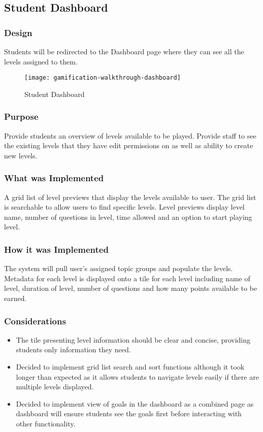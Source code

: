 \newpage

\subsection{Student Dashboard}
\subsubsection{Design}
Students will be redirected to the Dashboard page where they can see all the levels assigned to them.

\begin{figure}[h!]
    \texttt{[image: gamification-walkthrough-dashboard]}
    \centering
    \caption{Student Dashboard}
\end{figure}

\subsubsection{Purpose}
Provide students an overview of levels available to be played. Provide staff to see the existing levels that they have edit permissions on as well as ability to create new levels.

\subsubsection{What was Implemented}
A grid list of level previews that display the levels available to user. The grid list is searchable to allow users to find specific levels. Level previews display level name, number of questions in level, time allowed and an option to start playing level.

\subsubsection{How it was Implemented}
The system will pull user’s assigned topic groups and populate the levels. Metadata for each level is displayed onto a tile for each level including name of level, duration of level, number of questions and how many points available to be earned. 

\subsubsection{Considerations}
\begin{itemize}
    \item The tile presenting level information should be clear and concise, providing students only information they need.
    \item Decided to implement grid list search and sort functions although it took longer than expected as it allows students to navigate levels easily if there are multiple levels displayed.
    \item Decided to implement view of goals in the dashboard as a combined page as dashboard will ensure students see the goals first before interacting with other functionality.
\end{itemize}

